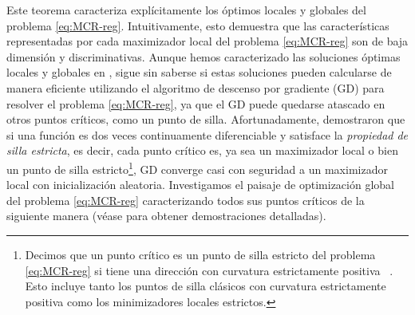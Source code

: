 \documentclass[../../book-main.tex]{subfiles}
\begin{document}
Este teorema caracteriza explícitamente los óptimos locales y globales del
problema \eqref{eq:MCR-reg}. Intuitivamente, esto demuestra que las características
representadas por cada maximizador local del problema \eqref{eq:MCR-reg} son
de baja dimensión y discriminativas. Aunque hemos caracterizado
las soluciones óptimas locales y globales en , sigue 
sin saberse si estas soluciones pueden calcularse de manera eficiente utilizando 
el algoritmo de descenso por gradiente (GD) para resolver el problema
\eqref{eq:MCR-reg}, ya que el GD puede quedarse atascado en otros puntos críticos,
como un punto de silla. 
Afortunadamente, \cite{sun2015nonconvex,lee2016gradient} demostraron que si una
función es dos veces continuamente diferenciable y satisface la {\em
propiedad de silla estricta}, es decir, cada punto crítico es, ya sea un
maximizador local o bien un punto de silla estricto\footnote{Decimos que un punto crítico
    es un punto de silla estricto del problema \eqref{eq:MCR-reg} si
    tiene una dirección con curvatura estrictamente positiva
    ~\cite{sun2015nonconvex}. Esto incluye tanto los puntos de silla clásicos
    con curvatura estrictamente positiva como los minimizadores locales
    estrictos.}, GD converge casi con seguridad a un maximizador local con
inicialización aleatoria. Investigamos el paisaje de optimización global
del problema \eqref{eq:MCR-reg} caracterizando todos sus
puntos críticos de la siguiente manera (véase \cite[Teorema 3.3]{wang2024global}
para obtener demostraciones detalladas).
\end{document}
